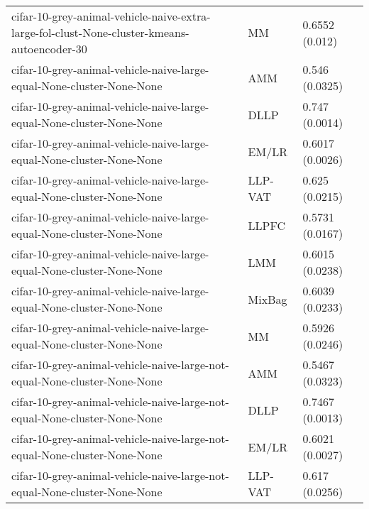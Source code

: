 \begin{longtable}{lll}
                  cifar-10-grey-animal-vehicle-naive-extra-large-fol-clust-None-cluster-kmeans-autoencoder-30 &        MM &                            0.6552 (0.012) \\
                                        cifar-10-grey-animal-vehicle-naive-large-equal-None-cluster-None-None &       AMM &                            0.546 (0.0325) \\
                                        cifar-10-grey-animal-vehicle-naive-large-equal-None-cluster-None-None &      DLLP &                            0.747 (0.0014) \\
                                        cifar-10-grey-animal-vehicle-naive-large-equal-None-cluster-None-None &     EM/LR &                           0.6017 (0.0026) \\
                                        cifar-10-grey-animal-vehicle-naive-large-equal-None-cluster-None-None &   LLP-VAT &                            0.625 (0.0215) \\
                                        cifar-10-grey-animal-vehicle-naive-large-equal-None-cluster-None-None &     LLPFC &                           0.5731 (0.0167) \\
                                        cifar-10-grey-animal-vehicle-naive-large-equal-None-cluster-None-None &       LMM &                           0.6015 (0.0238) \\
                                        cifar-10-grey-animal-vehicle-naive-large-equal-None-cluster-None-None &    MixBag &                           0.6039 (0.0233) \\
                                        cifar-10-grey-animal-vehicle-naive-large-equal-None-cluster-None-None &        MM &                           0.5926 (0.0246) \\
                                    cifar-10-grey-animal-vehicle-naive-large-not-equal-None-cluster-None-None &       AMM &                           0.5467 (0.0323) \\
                                    cifar-10-grey-animal-vehicle-naive-large-not-equal-None-cluster-None-None &      DLLP &                           0.7467 (0.0013) \\
                                    cifar-10-grey-animal-vehicle-naive-large-not-equal-None-cluster-None-None &     EM/LR &                           0.6021 (0.0027) \\
                                    cifar-10-grey-animal-vehicle-naive-large-not-equal-None-cluster-None-None &   LLP-VAT &                            0.617 (0.0256) \\

\end{longtable}
